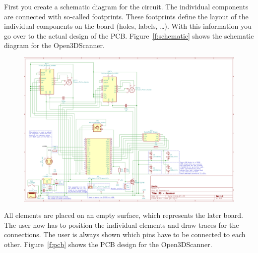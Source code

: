 First you create a schematic diagram for the circuit. The individual components are connected with so-called footprints. These footprints define the layout of the individual components on the board (holes, labels, \dots). With this information you go over to the actual design of the PCB. Figure~\ref{f:schematic} shows the schematic diagram for the Open3DScanner.%

\begin{figure}[ht!]%
		\includegraphics[width=\linewidth]{images/Schematic.png}%
\end{figure}%


All elements are placed on an empty surface, which represents the later board. The user now has to position the individual elements and draw traces for the connections. The user is always shown which pins have to be connected to each other. Figure~\ref{f:pcb} shows the PCB design for the Open3DScanner.%


